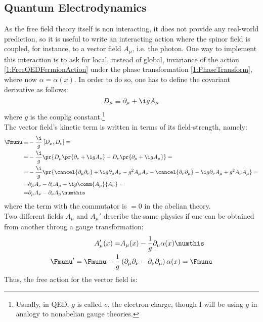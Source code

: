 \subsection{Quantum Electrodynamics\label{Sec:QED}}
As the free field theory itself is non interacting, it does not provide any real-world prediction, so it is useful to write an interacting action where the spinor field is coupled, for instance, to a vector field $A_\mu$, i.e. the photon.
One way to implement this interaction is to ask for local, instead of global, invariance of the action \eqref{1:FreeQEDFermionAction} under the phase transformation \eqref{1:PhaseTransform}, where now $\alpha=\alpha(x)$.
In order to do so, one has to define the covariant derivative as follows:
\begin{equation}
    D_\mu \equiv \partial_\mu+\i g A_\mu \label{1:QEDCovDeriv}
\end{equation}
where $g$ is the couplig constant.\footnote{Usually, in QED, $g$ is called $e$, the electron charge, though I will be using $g$ in analogy to nonabelian gauge theories.}\\
The vector field's kinetic term is written in terms of its field-strength, namely:
\begin{align*}
    \Fmunu\equiv& -\frac{\i}{g}\left[D_\mu,D_\nu\right] = \\
    =& -\frac{\i}{g}\pr{D_\mu\pr{\partial_\nu+\i g A_\nu} - D_\nu\pr{\partial_\mu+\i g A_\mu}}=\\
    =& -\frac{\i}{g}\pr{\cancel{\partial_\mu\partial_\nu} + \i g\partial_\mu A_\nu -g^2A_\mu A_\nu - \cancel{\partial_\nu\partial_\mu} - \i g\partial_\nu A_\mu + g^2A_\nu A_\mu}=\\
    =& \partial_\mu A_\nu - \partial_\nu A_\mu + \i g\comm{A_\mu}{A_\nu}=\\
    =& \partial_\mu A_\nu - \partial_\nu A_\mu \numthis\label{1:FieldStrU1}
\end{align*}
where the term with the commutator is $=0$ in the abelian theory.\\
Two different fields $A_\mu$ and $A_\mu'$ describe the same physics if one can be obtained from another throug a gauge transformation:
\begin{align*}
    A_\mu'(x) =& A_\mu(x) - \frac1g \partial_\mu\alpha(x) \numthis\label{1:QEDGaugeTransf} \\
    \Fmunu' = \Fmunu - \frac1g&\left( \partial_\mu\partial_\nu-\partial_\nu\partial_\mu \right)\alpha(x) = \Fmunu
\end{align*}
Thus, the free action for the vector field is:
